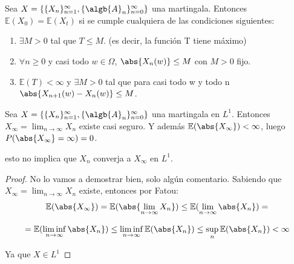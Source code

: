 \documentclass{apuntes}
\begin{document}
\begin{theorem}

Sea $X=\{\{X_n\}_{n=1}^{\infty}, \{\algb{A}_n\}_{n=0}^{\infty}\}$ una martingala. Entonces $\mathbb{E}(X_0)=\mathbb{E}(X_t)$ si se cumple cualquiera de las condiciones siguientes:
\begin{enumerate}
\item $\exists M >0$ tal que $T \leq M$. (es decir, la función T tiene máximo)
\item $\forall n \geq 0$ y casi todo $w \in \Omega$, $\abs{X_n(w)} \leq M$ con $M >0$ fijo.
\item $\mathbb{E}(T)<\infty$ y $\exists M > 0$ tal que para casi todo w y todo n $\abs{X_{n+1}(w) - X_n(w)} \leq M$.
\end{enumerate}
\end{theorem}

\begin{theorem}

Sea $X=\{\{X_n\}_{n=1}^{\infty}, \{\algb{A}_n\}_{n=0}^{\infty}\}$ una martingala en $L^1$. Entonces $X_{\infty}=\lim_{n \rightarrow \infty} X_n$ existe casi seguro. Y además $\mathbb{E}(\abs{X_{\infty}})<\infty$, luego $P(\abs{X_{\infty}}=\infty)=0$.

\obs  esto no implica que $X_n$ converja a $X_{\infty}$ en $L^1$.

\end{theorem}


\begin{proof}
No lo vamos a demostrar bien, solo algún comentario. Sabiendo que $X_{\infty}=\lim_{n \rightarrow \infty} X_n$ existe, entonces por Fatou:
\[
\mathbb{E}(\abs{X_{\infty}}) = \mathbb{E}(\abs{\lim_{n \rightarrow \infty} X_n}) \leq \mathbb{E}(\lim_{n \rightarrow \infty} \abs{X_n}) = 
\]

\[
= \mathbb{E}(\liminf_{n \rightarrow \infty} \abs{X_n}) \leq \liminf_{n \rightarrow \infty} \mathbb{E}(\abs{X_n}) \leq \sup_n \mathbb{E}(\abs{X_n}) <\infty
\]

Ya que $X \in L^1$

\end{proof}
\end{document}
